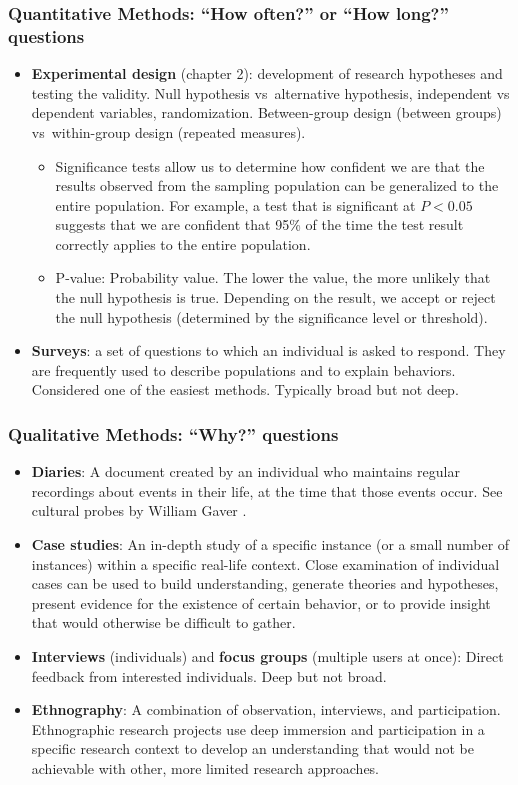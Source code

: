 \documentclass[screen, aspectratio=169]{beamer}
\begin{document}
%
%
\begin{frame}
\frametitle{Quantitative Methods: ``How often?'' or ``How long?'' questions}
\begin{itemize}
\item \textbf{Experimental design} (chapter 2): development of research hypotheses and testing the validity. Null hypothesis vs\ alternative hypothesis, independent vs dependent variables, randomization. Between-group design (between groups) vs\ within-group design (repeated measures).
\begin{itemize}
\item Significance tests allow us to determine how confident we are that the results observed from the sampling population can be generalized to the entire population. For example, a test that is significant at $P<0.05$ suggests that we are confident that 95\% of the time the test result correctly applies to the entire population.
\item P-value: Probability value. The lower the value, the more unlikely that the null hypothesis is true. Depending on the result, we accept or reject the null hypothesis (determined by the significance level or threshold).
\end{itemize}
\item \textbf{Surveys}: a set of questions to which an individual is asked to respond. They are frequently used to describe populations and to explain behaviors. Considered one of the easiest methods. Typically broad but not deep.
\end{itemize}
\end{frame}
%
\begin{frame}
\frametitle{Qualitative Methods: ``Why?'' questions}
\begin{itemize}
\item \textbf{Diaries}: A document created by an individual who maintains regular recordings about events in their life, at the time that those events occur. See cultural probes by William Gaver \cite{Gaver.2004.cultural}.
\item \textbf{Case studies}: An in-depth study of a specific instance (or a small number of instances) within a specific real-life context. Close examination of individual cases can be used to build understanding, generate theories and hypotheses, present evidence for the existence of certain behavior, or to provide insight that would otherwise be difficult to gather.
\item \textbf{Interviews} (individuals) and \textbf{focus groups} (multiple users at once): Direct feedback from interested individuals. Deep but not broad.
\item \textbf{Ethnography}: A combination of observation, interviews, and participation. Ethnographic research projects use deep immersion and participation in a specific research context to develop an understanding that would not be achievable with other, more limited research approaches.
\end{itemize}
\end{frame}
\end{document}
